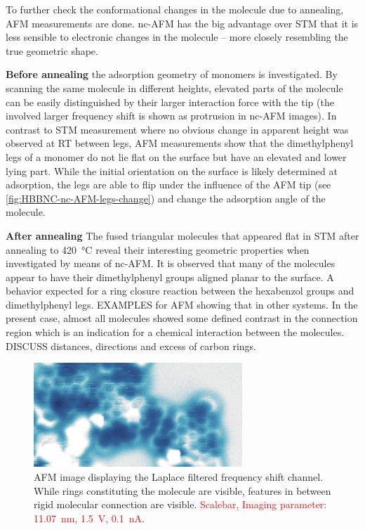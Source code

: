 To further check the conformational changes in the molecule due to annealing, AFM measurements are done. nc-AFM has the big advantage over STM that it is less sensible to electronic changes in the molecule – more closely resembling the true geometric shape.

\textbf{Before annealing} the adsorption geometry of monomers is investigated. By scanning the same molecule in different heights, elevated parts of the molecule can be easily distinguished by their larger interaction force with the tip (the involved larger frequency shift is shown as protrusion in nc-AFM images). In contrast to STM measurement where no obvious change in apparent height was observed at RT between legs, AFM measurements show that the dimethylphenyl legs of a monomer do not lie flat on the surface but have an elevated and lower lying part. While the initial orientation on the surface is likely determined at adsorption, the legs are able to flip under the influence of the AFM tip (see \autoref{fig:HBBNC-nc-AFM-legs-change}) and change the adsorption angle of the molecule.

\textbf{After annealing}
The fused triangular molecules that appeared flat in STM after annealing to \SI{420}{\celsius} reveal their interesting geometric properties when investigated by means of nc-AFM. It is observed that many of the molecules appear to have their dimethylphenyl groups aligned planar to the surface. A behavior expected for a ring closure reaction between the hexabenzol groups and dimethylphenyl legs.
 EXAMPLES for AFM showing that in other systems. 
In the present case, almost all molecules showed some defined contrast in the connection region which is an indication for a chemical interaction between the molecules.
 DISCUSS distances, directions and excess of carbon rings.

\begin{figure}[] \centering
	\includegraphics[width=0.7\textwidth]{./images/hbbnc-annealed-afm}
	\caption{AFM image displaying the Laplace filtered frequency shift channel. While rings constituting the molecule are visible, features in between rigid molecular connection are visible. \textcolor{red}{Scalebar, Imaging parameter: \SI{11.07}{\nano \meter}, \SI{1.5}{\volt}, \SI{0.1}{\nano \ampere}}.}
	\label{}
\end{figure}


